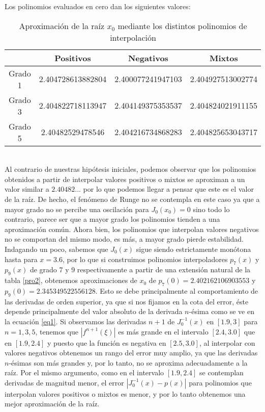 \documentclass[a4paper]{article}
\begin{document}
Los polinomios evaluados en cero dan los siguientes valores:
\begin{table}[ht]
    \centering
    \begin{tabular}{|c|c|c|c|}
        \hline
        & Positivos & Negativos & Mixtos \\
        \hline
        Grado 1& 2.404728613882804 & 2.400077241947103 & 2.404927513002774\\
        \hline
        Grado 3& 2.404822718113947 & 2.404149375353537 & 2.404824021911155\\	
        \hline   
        Grado 5 & 2.40482529478546 & 2.404216734868283 & 2.404825653043717 \\	
        \hline
    \end{tabular}
    \caption{Aproximación de la raíz $x_0$ mediante los distintos polinomios de interpolación}
\end{table}\\
Al contrario de nuestras hipótesis iniciales, podemos observar que los polinomios obtenidos a partir de interpolar valores positivos o mixtos se aproximan a un valor similar a $2.40482...$ por lo que podemos llegar a pensar que este es el valor de la raíz. De hecho, el fenómeno de Runge no se contempla en este caso ya que a mayor grado no se percibe una oscilación para $J_0(x_0)=0$ sino todo lo contrario, parece ser que a mayor grado los polinomios tienden a una aproximación común. Ahora bien, los polinomios que interpolan valores negativos no se comportan del mismo modo, es más, a mayor grado pierde estabilidad. Indagando un poco, sabemos que $J_0(x)$  sigue siendo estrictamente monótona hasta para $x=3.6$, por lo que si construimos polinomios interpoladores $p_7(x)$ y $p_9(x)$ de grado 7 y 9 respectivamente a partir de una extensión natural de la tabla \ref{pro2}, obtenemos aproximaciones de $x_0$ de $p_7(0)=2.402162106903553$ y $p_9(0)=2.345349522556128$. 
\newline Esto se debe principalmente al comportamiento de las derivadas de orden superior, ya que si nos fijamos en la cota del error, éste depende principalmente del valor absoluto de la derivada $n$-ésima como se ve en la ecuación \eqref{eq1}. Si observamos las derivadas $n+1$ de $J_0^{-1}(x)$ en $[1.9,3]$ para $n=1,3,5$, tenemos que $|f^{n+1}(\xi)|$ es más grande en el intervalo $[2.4,3.0]$ que en $[1.9,2.4]$ y puesto que la función es negativa en $[2.5,3.0]$, al interpolar con valores negativos obtenemos un rango del error muy amplio, ya que las derivadas $n$-ésimas son más grandes y, por lo tanto, no se aproxima adecuadamente a la raíz. Por el mismo argumento, como en el intervalo $[1.9,2.4]$ se contemplan derivadas de magnitud menor, el error $|J^{-1}_0(x)-p(x)|$ para polinomios que interpolan valores positivos o mixtos es menor, y por lo tanto obtenemos una mejor aproximación de la raíz.
\end{document}
